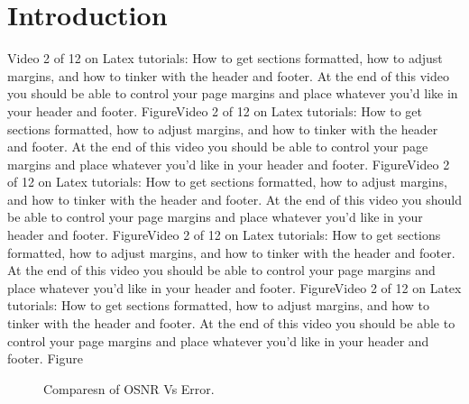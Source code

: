 \documentclass[12pt]{report}
\begin{document}
	\section{Introduction}
	Video 2 of 12 on Latex tutorials: How to get sections formatted, how to adjust margins, and how to tinker with the header and footer. At the end of this video you should be able to control your page margins and place whatever you'd like in your header and footer. FigureVideo 2 of 12 on Latex tutorials: How to get sections formatted, how to adjust margins, and how to tinker with the header and footer. At the end of this video you should be able to control your page margins and place whatever you'd like in your header and footer. FigureVideo 2 of 12 on Latex tutorials: How to get sections formatted, how to adjust margins, and how to tinker with the header and footer. At the end of this video you should be able to control your page margins and place whatever you'd like in your header and footer. FigureVideo 2 of 12 on Latex tutorials: How to get sections formatted, how to adjust margins, and how to tinker with the header and footer. At the end of this video you should be able to control your page margins and place whatever you'd like in your header and footer. FigureVideo 2 of 12 on Latex tutorials: How to get sections formatted, how to adjust margins, and how to tinker with the header and footer. At the end of this video you should be able to control your page margins and place whatever you'd like in your header and footer. Figure
	\begin{figure}[htbp]
		\caption{Comparesn of OSNR Vs Error.}
		\label{fig1}
	\end{figure}
	
\end{document}
